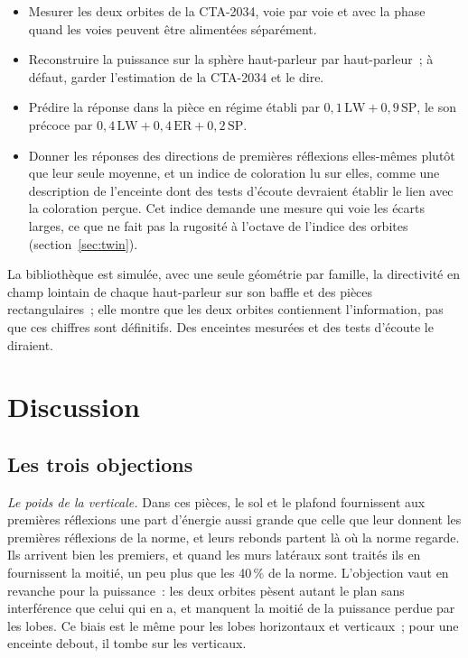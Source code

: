 \documentclass[11pt,a4paper]{article}
\begin{document}
\begin{itemize}
\item Mesurer les deux orbites de la CTA-2034, voie par voie et avec la phase quand les voies peuvent
être alimentées séparément.
\item Reconstruire la puissance sur la sphère haut-parleur par haut-parleur~; à défaut, garder
l'estimation de la CTA-2034 et le dire.
\item Prédire la réponse dans la pièce en régime établi par $0,1\,\mathrm{LW} + 0,9\,\mathrm{SP}$, le son précoce
par $0,4\,\mathrm{LW} + 0,4\,\mathrm{ER} + 0,2\,\mathrm{SP}$.
\item Donner les réponses des directions de premières réflexions elles-mêmes plutôt que leur seule
moyenne, et un indice de coloration lu sur elles, comme une description de l'enceinte dont des tests
d'écoute devraient établir le lien avec la coloration perçue. Cet indice demande une mesure qui voie les
écarts larges, ce que ne fait pas la rugosité à l'octave de l'indice des orbites
(section~\ref{sec:twin}).
\end{itemize}
La bibliothèque est simulée, avec une seule géométrie par famille, la directivité en champ lointain de
chaque haut-parleur sur son baffle et des pièces rectangulaires~; elle montre que les deux orbites
contiennent l'information, pas que ces chiffres sont définitifs. Des enceintes mesurées et des tests
d'écoute le diraient.

\section{Discussion}

\subsection{Les trois objections}

\emph{Le poids de la verticale.} Dans ces pièces, le sol et le plafond fournissent aux premières
réflexions une part d'énergie aussi grande que celle que leur donnent les premières réflexions de la
norme, et leurs rebonds partent là où la norme regarde. Ils arrivent bien les premiers, et quand les
murs latéraux sont traités ils en fournissent la moitié, un peu plus que les 40\,\% de la norme.
L'objection vaut en revanche pour la puissance~: les deux orbites pèsent autant le plan sans
interférence que celui qui en a, et manquent la moitié de la puissance perdue par les lobes. Ce biais
est le même pour les lobes horizontaux et verticaux~; pour une enceinte debout, il tombe sur les
verticaux.
\end{document}
